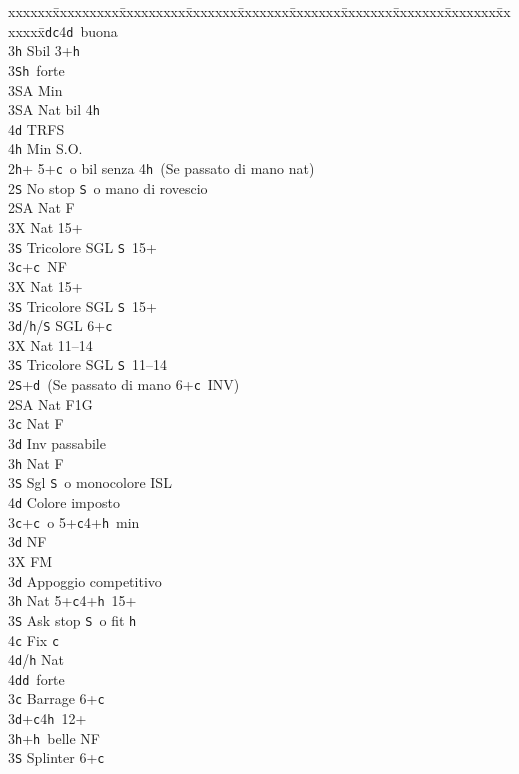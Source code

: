\documentclass[a4paper,italian]{article}
\newcommand{\BS}{\small{\texttt{S}}}
\newcommand{\BC}{\small{\texttt{c}}}
\newcommand{\BD}{\small{\texttt{d}}}
\newcommand{\BH}{\small{\texttt{h}}}
\newenvironment{bidtable}
{\begin{tabbing}

    xxxxxx\=xxxxxxxxx\=xxxxxxxxx\=xxxxxxx\=xxxxxxx\=xxxxxxx\=xxxxxxx\=xxxxxxx\=xxxxxxx\=xxxxxxx\=\kill}
{\end{tabbing} }%
\begin{document}
\begin{multicols}{2}
\begin{bidtable}
        3\BD {}\BC 4\BD\ buona\\
        3\BH \> Sbil 3+\BH \\
        3\BS {}\BH\ forte\+\\
        3\small{SA} \> Min\-\\
        3\small{SA} \> Nat bil 4\BH \+\\
        4\BD \> TRFS\-\\
        4\BH \> Min S.O.\-\\
        2\BH {}+ 5+\BC\ o bil senza 4\BH\ (Se passato di mano nat)\+\\
        2\BS \> No stop \BS\ o mano di rovescio\+\\
        2\small{SA} \> Nat F\+\\
        3X \> Nat 15+\\
        3\BS \> Tricolore SGL \BS\ 15+\-\\
        3\BC {}+\BC\ NF\+\\
        3X \> Nat 15+\\
        3\BS \> Tricolore SGL \BS\ 15+\-\\
        3\BD/\BH/\BS \> SGL 6+\BC \-\\
        3X \> Nat 11--14\\
        3\BS \> Tricolore SGL \BS\  11--14\-\\
        2\BS {}+\BD\ (Se passato di mano 6+\BC\ INV)\+\\
        2\small{SA} \> Nat F1G\+\\
        3\BC \> Nat F\\
        3\BD \> Inv passabile\\
        3\BH \> Nat F\\
        3\BS \> Sgl \BS\ o monocolore ISL\\
        4\BD \> Colore imposto\-\\
        3\BC {}+\BC\ o 5+\BC 4+\BH\ min\+\\
        3\BD \> NF\\
        3X \> FM\-\\
        3\BD \> Appoggio competitivo\\
        3\BH \> Nat 5+\BC 4+\BH\ 15+\+\\
        3\BS \> Ask stop \BS\ o fit \BH \\
        4\BC \> Fix \BC \\
        4\BD/\BH \> Nat\-\\
        4\BD {}\BD\ forte\-\\
        3\BC \> Barrage 6+\BC \\
        3\BD {}+\BC 4\BH\ 12+\\
        3\BH {}+\BH\ belle NF\\
        3\BS \> Splinter 6+\BC \-
    \end{bidtable}


\end{multicols}
\end{document}

